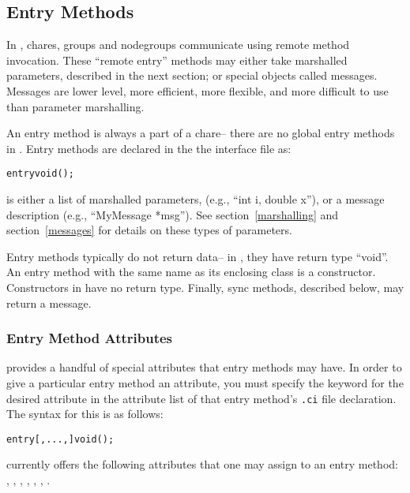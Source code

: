 \subsection{Entry Methods}
\label{entry}

In \charmpp, chares, groups and 
nodegroups communicate using remote method invocation.  These ``remote entry'' methods may either take marshalled parameters, described in the next section; or special objects called messages.  Messages are lower level, more efficient, more flexible, and more difficult to use than parameter marshalling.

An entry method is always a part of a chare--
there are no global entry methods in \charmpp{}.
Entry methods are declared in the the interface file as:

\begin{alltt}
entry void ();
\end{alltt}

 is either a list of marshalled parameters,
(e.g., ``int i, double x''), or a message description (e.g.,
``MyMessage *msg'').  See section~\ref{marshalling} and
section~\ref{messages} for details on these types of
parameters.

Entry methods typically do not return data-- in \CC, they have
return type ``void''.  An entry method with the same name
as its enclosing class is a constructor.  Constructors in \CC
have no return type.  Finally, sync methods, described below,
may return a message.

\subsubsection{Entry Method Attributes}
\label{attributes}

\charmpp{}  provides a handful of special attributes that entry methods may have.  In order to give a particular entry method an attribute, you must specify the keyword for the desired
attribute in the attribute list of that entry method's {\tt .ci} file
declaration.  The syntax for this is as follows:

\begin{alltt}
entry [, ..., ] void ();
\end{alltt}

\charmpp{} currently offers the following attributes that one may assign to 
an entry method:
, , , , , , .


